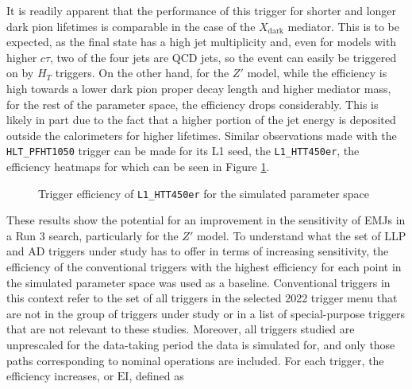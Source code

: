 It is readily apparent that the performance of this trigger for shorter and longer dark pion lifetimes is comparable in the case of the $X_{\text{dark}}$ mediator. This is to be expected, as the final state has a high jet multiplicity and, even for models with higher $c\tau$, two of the four jets are QCD jets, so the event can easily be triggered on by $H_T$ triggers. On the other hand, for the $Z'$ model, while the efficiency is high towards a lower dark pion proper decay length and higher mediator mass, for the rest of the parameter space, the efficiency drops considerably. This is likely in part due to the fact that a higher portion of the jet energy is deposited outside the calorimeters for higher lifetimes. Similar observations made with the \texttt{HLT\_PFHT1050} trigger can be made for its L1 seed, the \texttt{L1\_HTT450er}, the efficiency heatmaps for which can be seen in Figure \ref{fig:htt450er}.

\begin{figure}[h]
    \centering
    \begin{subfigure}{0.45\textwidth}
        
    \end{subfigure}
    \hfill
    \begin{subfigure}{0.45\textwidth}
        
    \end{subfigure}
    \caption{Trigger efficiency of \texttt{L1\_HTT450er} for the simulated parameter space}
    \label{fig:htt450er}
\end{figure}

These results show the potential for an improvement in the sensitivity of EMJs in a Run 3 search, particularly for the $Z'$ model. To understand what the set of LLP and AD triggers under study has to offer in terms of increasing sensitivity, the efficiency of the conventional triggers with the highest efficiency for each point in the simulated parameter space was used as a baseline. Conventional triggers in this context refer to the set of all triggers in the selected 2022 trigger menu that are not in the group of triggers under study or in a list of special-purpose triggers that are not relevant to these studies. Moreover, all triggers studied are unprescaled for the data-taking period the data is simulated for, and only those paths corresponding to nominal operations are included. For each trigger, the efficiency increases, or $\text{EI}$, defined as

